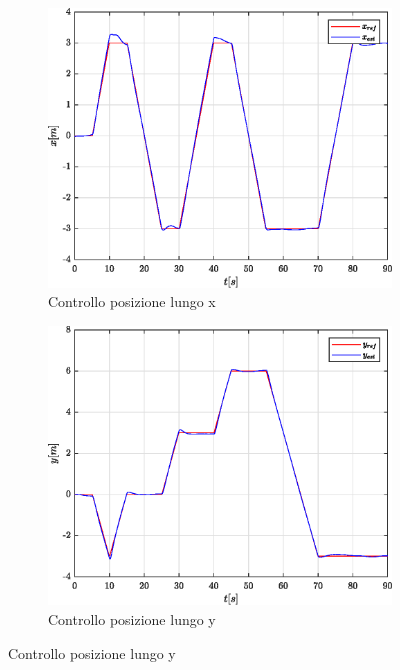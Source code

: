 \begin{figure}
	\centering
	\begin{subfigure}{0.45\textwidth}
		\centering
		\includegraphics[width=1\textwidth]{Simulazioni/Figure/PID/SNAKE/PositionControlXPos}
		\caption{Controllo posizione lungo x}
		\label{fig:SNAKEerrposxPID}
	\end{subfigure}
	\hfill
	\begin{subfigure}{0.45\textwidth}
		\centering
		\includegraphics[width=1\textwidth]{Simulazioni/Figure/PID/SNAKE/PositionControlYPos}
		\caption{Controllo posizione lungo y}
		\label{fig:SNAKEerrposyPID}

\end{subfigure}
\end{figure}
